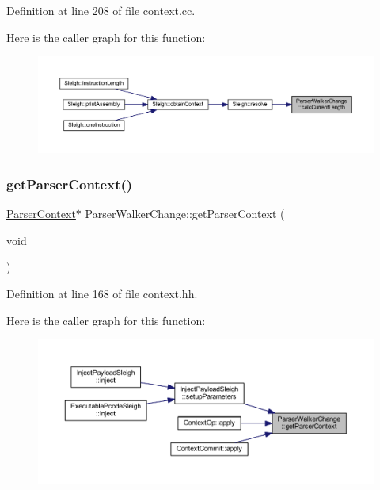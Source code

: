 Definition at line 208 of file context.\+cc.

Here is the caller graph for this function\+:
\nopagebreak
\begin{figure}[H]
\begin{center}
\leavevmode
\includegraphics[width=350pt]{class_parser_walker_change_a17bd52cea759f8d55a1c6e1514da9dc8_icgraph}
\end{center}
\end{figure}
\mbox{\label{class_parser_walker_change_afcfcb1813b7e0c61acf676144a524b33}} 
\subsubsection{\texorpdfstring{getParserContext()}{getParserContext()}}
{\footnotesize\ttfamily \mbox{\hyperlink{class_parser_context}{Parser\+Context}}$\ast$ Parser\+Walker\+Change\+::get\+Parser\+Context (\begin{DoxyParamCaption}\item[{void}]{ }\end{DoxyParamCaption})\hspace{0.3cm}{\ttfamily [inline]}}



Definition at line 168 of file context.\+hh.

Here is the caller graph for this function\+:
\nopagebreak
\begin{figure}[H]
\begin{center}
\leavevmode
\includegraphics[width=350pt]{class_parser_walker_change_afcfcb1813b7e0c61acf676144a524b33_icgraph}
\end{center}
\end{figure}
\mbox{\label{class_parser_walker_change_aae58d318a27711b1188d825efe36a63d}} 
